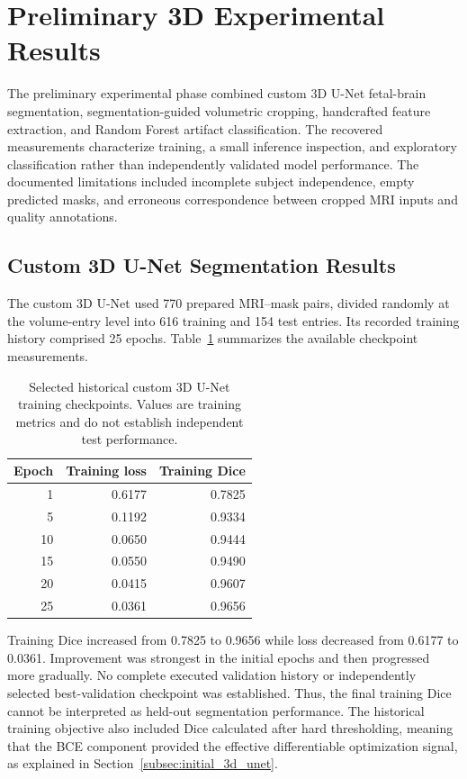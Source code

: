 \section{Preliminary 3D Experimental Results}
\label{sec:results_3d_segmentation}

The preliminary experimental phase combined custom 3D U-Net fetal-brain segmentation, segmentation-guided volumetric cropping, handcrafted feature extraction, and Random Forest artifact classification. The recovered measurements characterize training, a small inference inspection, and exploratory classification rather than independently validated model performance. The documented limitations included incomplete subject independence, empty predicted masks, and erroneous correspondence between cropped MRI inputs and quality annotations.

\subsection{Custom 3D U-Net Segmentation Results}
\label{subsec:historical_3d_segmentation}

The custom 3D U-Net used 770 prepared MRI--mask pairs, divided randomly at the volume-entry level into 616 training and 154 test entries. Its recorded training history comprised 25 epochs. Table~\ref{tab:historical_unet_training} summarizes the available checkpoint measurements.

\begin{table}[htbp]
\centering
\caption{Selected historical custom 3D U-Net training checkpoints. Values are training metrics and do not establish independent test performance.}
\label{tab:historical_unet_training}
\begin{tabular}{rrr}
\hline
Epoch & Training loss & Training Dice \\
\hline
1 & 0.6177 & 0.7825 \\
5 & 0.1192 & 0.9334 \\
10 & 0.0650 & 0.9444 \\
15 & 0.0550 & 0.9490 \\
20 & 0.0415 & 0.9607 \\
25 & 0.0361 & 0.9656 \\
\hline
\end{tabular}
\end{table}

Training Dice increased from 0.7825 to 0.9656 while loss decreased from 0.6177 to 0.0361. Improvement was strongest in the initial epochs and then progressed more gradually. No complete executed validation history or independently selected best-validation checkpoint was established. Thus, the final training Dice cannot be interpreted as held-out segmentation performance. The historical training objective also included Dice calculated after hard thresholding, meaning that the BCE component provided the effective differentiable optimization signal, as explained in Section~\ref{subsec:initial_3d_unet}.

